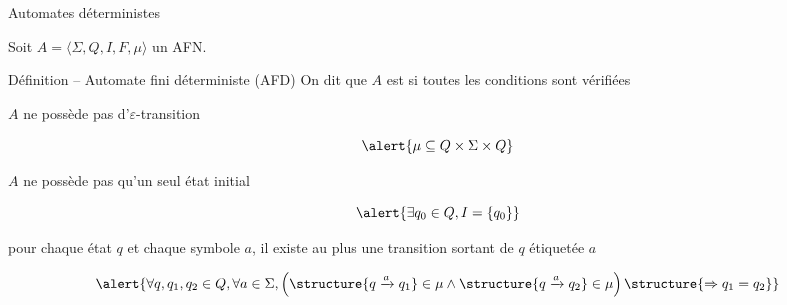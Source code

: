 
\begingroup

\begin{frame}{Automates déterministes}

  Soit $A = \langle \Sigma, Q, I, F, \mu \rangle$ un AFN.
  
  \begin{block}{Définition -- Automate fini déterministe (AFD)}
    On dit que $A$ est  si toutes les conditions sont vérifiées
    \begin{description}
    \item[$\varepsilon$-libre :] $A$ ne possède pas d'$\varepsilon$-transition

      $$\alert{\mu \subseteq Q \times \Sigma \times Q}$$

    \item[unitaire :] $A$ ne possède pas qu'un seul état initial

      $$\alert{\exists q_0\in Q, I = \{q_0\}}$$

    \item[fonction partielle :] pour chaque état $q$ et chaque symbole $a$, il existe au plus une transition sortant de $q$ étiquetée $a$

      $$\alert{\forall q, q_1, q_2\in Q,  \forall a\in \Sigma, \left(\structure{q\xrightarrow{a} q_1} \in \mu \land \structure{q\xrightarrow{a} q_2} \in \mu\right) \structure{\Rightarrow q_1 = q_2}}$$
    \end{description}
  \end{block}

\end{frame}

\endgroup
